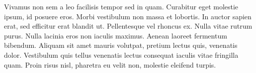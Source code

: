 \documentclass[10pt]{article}
\begin{document}
\begin{multicols}{2}
Vivamus non sem a leo facilisis tempor sed in quam. Curabitur eget molestie ipsum, id posuere eros. Morbi vestibulum non massa et lobortis. In auctor sapien erat, sed efficitur erat blandit ut. Pellentesque vel rhoncus ex. Nulla vitae rutrum purus. Nulla lacinia eros non iaculis maximus. Aenean laoreet fermentum bibendum. Aliquam sit amet mauris volutpat, pretium lectus quis, venenatis dolor. Vestibulum quis tellus venenatis lectus consequat iaculis vitae fringilla quam. Proin risus nisl, pharetra eu velit non, molestie eleifend turpis.

\end{multicols}
\end{document}
